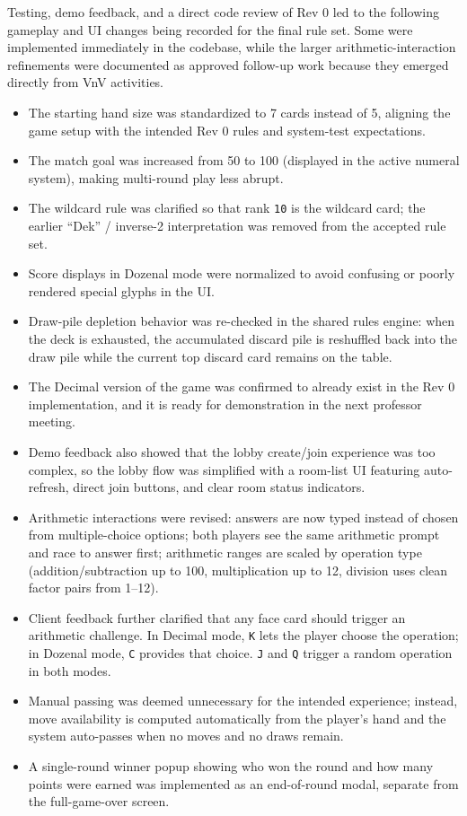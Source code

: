 \documentclass[12pt, titlepage]{article}
\begin{document}
    Testing, demo feedback, and a direct code review of Rev 0 led to the
    following gameplay and UI changes being recorded for the final rule set.
    Some were implemented immediately in the codebase, while the larger
    arithmetic-interaction refinements were documented as approved follow-up
    work because they emerged directly from VnV activities.

    \begin{itemize}
        \item The starting hand size was standardized to 7 cards instead of 5, aligning the game setup with the intended Rev 0 rules and system-test expectations.
        \item The match goal was increased from 50 to 100 (displayed in the active numeral system), making multi-round play less abrupt.
        \item The wildcard rule was clarified so that rank \texttt{10} is the wildcard card; the earlier ``Dek'' / inverse-2 interpretation was removed from the accepted rule set.
        \item Score displays in Dozenal mode were normalized to avoid confusing or poorly rendered special glyphs in the UI.
        \item Draw-pile depletion behavior was re-checked in the shared rules engine: when the deck is exhausted, the accumulated discard pile is reshuffled back into the draw pile while the current top discard card remains on the table.
        \item The Decimal version of the game was confirmed to already exist in the Rev 0 implementation, and it is ready for demonstration in the next professor meeting.
        \item Demo feedback also showed that the lobby create/join experience was too complex, so the lobby flow was simplified with a room-list UI featuring auto-refresh, direct join buttons, and clear room status indicators.
        \item Arithmetic interactions were revised: answers are now typed instead of chosen from multiple-choice options; both players see the same arithmetic prompt and race to answer first; arithmetic ranges are scaled by operation type (addition/subtraction up to 100, multiplication up to 12, division uses clean factor pairs from 1--12).
        \item Client feedback further clarified that any face card should trigger an arithmetic challenge. In Decimal mode, \texttt{K} lets the player choose the operation; in Dozenal mode, \texttt{C} provides that choice. \texttt{J} and \texttt{Q} trigger a random operation in both modes.
        \item Manual passing was deemed unnecessary for the intended experience; instead, move availability is computed automatically from the player's hand and the system auto-passes when no moves and no draws remain.
        \item A single-round winner popup showing who won the round and how many points were earned was implemented as an end-of-round modal, separate from the full-game-over screen.
    \end{itemize}
\end{document}
